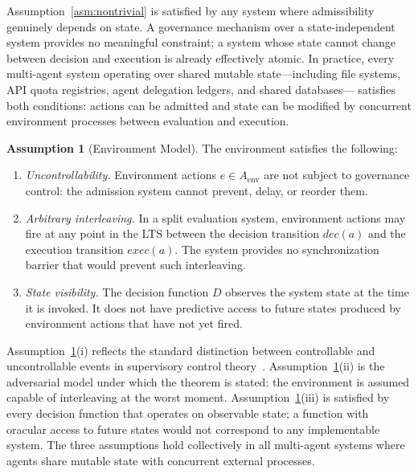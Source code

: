 \documentclass[11pt]{article}
\theoremstyle{plain}
\theoremstyle{definition}
\newtheorem{assumption}[theorem]{Assumption}
\theoremstyle{remark}
\begin{document}
Assumption~\ref{asm:nontrivial} is satisfied by any system where admissibility
genuinely depends on state.  A governance mechanism over a state-independent
system provides no meaningful constraint; a system whose state cannot change
between decision and execution is already effectively atomic.  In practice,
every multi-agent system operating over shared mutable state---including file
systems, API quota registries, agent delegation ledgers, and shared databases---
satisfies both conditions: actions can be admitted and state can be modified
by concurrent environment processes between evaluation and execution.

\begin{assumption}[Environment Model]
\label{asm:env}
The environment satisfies the following:
\begin{enumerate}[label=(\roman*)]
  \item \emph{Uncontrollability.}  Environment actions $e \in A_{\mathrm{env}}$
    are not subject to governance control: the admission system cannot prevent,
    delay, or reorder them.

  \item \emph{Arbitrary interleaving.}  In a split evaluation system, environment
    actions may fire at any point in the LTS between the decision transition
    $\mathit{dec}(a)$ and the execution transition $\mathit{exec}(a)$.  The
    system provides no synchronization barrier that would prevent such
    interleaving.

  \item \emph{State visibility.}  The decision function $D$ observes the system
    state at the time it is invoked.  It does not have predictive access to
    future states produced by environment actions that have not yet fired.
\end{enumerate}
\end{assumption}

Assumption~\ref{asm:env}(i) reflects the standard distinction between
controllable and uncontrollable events in supervisory control
theory~\cite{ramadge87}.  Assumption~\ref{asm:env}(ii) is the adversarial model
under which the theorem is stated: the environment is assumed capable of
interleaving at the worst moment.  Assumption~\ref{asm:env}(iii) is satisfied
by every decision function that operates on observable state; a function
with oracular access to future states would not correspond to any implementable
system.  The three assumptions hold collectively in all multi-agent systems
where agents share mutable state with concurrent external processes.
\end{document}
